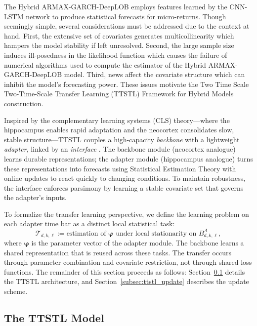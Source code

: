 \documentclass[10pt,a4paper,oneside]{article}
\providecommand{\DIFaddtex}[1]{{\protect\color{blue} \sf #1}} %
\providecommand{\DIFdeltex}[1]{{\protect\color{red} \scriptsize #1}} %
\providecommand{\DIFaddbegin}{} %
\providecommand{\DIFaddend}{} %
\providecommand{\DIFdelbegin}{} %
\providecommand{\DIFdelend}{} %
\providecommand{\DIFadd}[1]{\texorpdfstring{\DIFaddtex{#1}}{#1}} %
\providecommand{\DIFdel}[1]{\texorpdfstring{\DIFdeltex{#1}}{}} %
\newcommand{\DIFscaledelfig}{0.5}
\newlength{\DIFdelgraphicswidth} %
\newlength{\DIFdelgraphicsheight} %
\newcommand{\DIFaddincludegraphics}[2][]{{\color{blue}\fbox{\DIFOincludegraphics[#1]{#2}}}} %
\newcommand{\DIFdelincludegraphics}[2][]{%
\sbox{\DIFdelgraphicsbox}{\DIFOincludegraphics[#1]{#2}}%
\settoboxwidth{\DIFdelgraphicswidth}{\DIFdelgraphicsbox} %
\settoboxtotalheight{\DIFdelgraphicsheight}{\DIFdelgraphicsbox} %
\scalebox{\DIFscaledelfig}{%
\parbox[b]{\DIFdelgraphicswidth}{\usebox{\DIFdelgraphicsbox}\\[-\baselineskip] \rule{\DIFdelgraphicswidth}{0em}}\llap{\resizebox{\DIFdelgraphicswidth}{\DIFdelgraphicsheight}{%
\setlength{\unitlength}{\DIFdelgraphicswidth}%
\begin{picture}(1,1)%
\thicklines\linethickness{2pt} %
{\color[rgb]{1,0,0}\put(0,0){\framebox(1,1){}}}%
{\color[rgb]{1,0,0}\put(0,0){\line( 1,1){1}}}%
{\color[rgb]{1,0,0}\put(0,1){\line(1,-1){1}}}%
\end{picture}%
}\hspace*{3pt}}} %
} %
\DeclareRobustCommand{\DIFaddbegin}{\DIFOaddbegin \let\includegraphics\DIFaddincludegraphics} %
\DeclareRobustCommand{\DIFaddend}{\DIFOaddend \let\includegraphics\DIFOincludegraphics} %
\DeclareRobustCommand{\DIFdelbegin}{\DIFOdelbegin \let\includegraphics\DIFdelincludegraphics} %
\DeclareRobustCommand{\DIFdelend}{\DIFOaddend \let\includegraphics\DIFOincludegraphics} %
\begin{document}
The Hybrid ARMAX-GARCH-DeepLOB employs features learned by the CNN-LSTM network to produce statistical forecasts for micro-returns. Though seemingly simple, several considerations must be addressed due to the context at hand. First, the extensive set of covariates generates multicollinearity which hampers the model stability if left unresolved. Second, the large sample size induces ill-posedness in the likelihood function which causes the failure of numerical algorithms used to compute the estimator of the Hybrid ARMAX-GARCH-DeepLOB model. Third, news affect the covariate structure which can inhibit the model's forecasting power. These issues motivate the \DIFdelbegin \DIFdel{Two Time Scale }\DIFdelend \DIFaddbegin \DIFadd{Two-Time-Scale }\DIFaddend Transfer Learning (TTSTL) Framework for Hybrid Models construction.

Inspired by the complementary learning systems (CLS) theory—where the hippocampus enables rapid adaptation and the neocortex consolidates slow, stable structure—TTSTL couples a high-capacity \emph{backbone} with a lightweight \emph{adapter}, linked by an \emph{interface} \cite{pham_continual_2024}. The backbone module (neocortex analogue) learns durable representations; the adapter module (hippocampus analogue) turns these representations into forecasts using Statistical Estimation Theory with online updates to react quickly to changing conditions. To maintain robustness, the interface enforces parsimony by learning a stable covariate set that governs the adapter’s inputs.

To formalize the transfer learning perspective, we define the learning problem on each adapter time bar as a distinct local statistical task:
\[
\mathcal{T}_{d,k,\ell} := \text{estimation of } \boldsymbol{\varphi} \text{ under local stationarity on } B^A_{d,k,\ell},
\]
where $\boldsymbol{\varphi}$ is the parameter vector of the adapter module. The backbone learns a shared representation that is reused across these tasks. The transfer occurs through parameter combination and covariate restriction, not through shared loss functions. The remainder of this section proceeds as follows: Section~\ref{subsec:ttstl_model} details the TTSTL architecture, and Section~\ref{subsec:ttstl_update} describes the update scheme.

\subsection{The TTSTL Model}
\label{subsec:ttstl_model}
\end{document}
